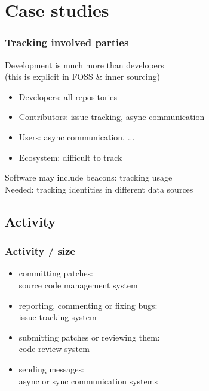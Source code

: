 \documentclass[17pt,aspectratio=169,hyperref=pdfusetitle]{beamer}
\begin{document}
\section{Case studies}


\begin{frame}
\frametitle{Tracking involved parties}

  Development is much more than developers \\
  (this is explicit in FOSS \& inner sourcing)
  
  \begin{itemize}
  \item Developers: all repositories
  \item Contributors: issue tracking, async communication
  \item Users: async communication, ...
  \item Ecosystem: difficult to track
  \end{itemize}

  \vspace{1cm}
  
  Software may include beacons: tracking usage \\

  Needed: tracking identities in different data sources \\
\end{frame}

\subsection{Activity}


\begin{frame}
\frametitle{Activity / size}

  \begin{itemize}
  \item committing patches: \\
    source code management system
  \item reporting, commenting or fixing bugs: \\
    issue tracking system
  \item submitting patches or reviewing them: \\
    code review system
  \item sending messages: \\
    async or sync communication systems
  \end{itemize}
\end{frame}
\end{document}

